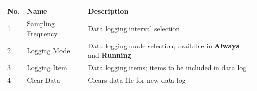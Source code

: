 \begin{longtable}[]{@{}lll@{}}
\toprule
\begin{minipage}[b]{0.04\columnwidth}\raggedright
No.\strut
\end{minipage} & \begin{minipage}[b]{0.23\columnwidth}\raggedright
Name\strut
\end{minipage} & \begin{minipage}[b]{0.65\columnwidth}\raggedright
Description\strut
\end{minipage}\tabularnewline
\midrule
\endhead
\begin{minipage}[t]{0.04\columnwidth}\raggedright
1\strut
\end{minipage} & \begin{minipage}[t]{0.23\columnwidth}\raggedright
Sampling Frequency\strut
\end{minipage} & \begin{minipage}[t]{0.65\columnwidth}\raggedright
Data logging interval selection\strut
\end{minipage}\tabularnewline
\begin{minipage}[t]{0.04\columnwidth}\raggedright
2\strut
\end{minipage} & \begin{minipage}[t]{0.23\columnwidth}\raggedright
Logging Mode\strut
\end{minipage} & \begin{minipage}[t]{0.65\columnwidth}\raggedright
Data logging mode selection; available in \textbf{Always} and
\textbf{Running}\strut
\end{minipage}\tabularnewline
\begin{minipage}[t]{0.04\columnwidth}\raggedright
3\strut
\end{minipage} & \begin{minipage}[t]{0.23\columnwidth}\raggedright
Logging Item\strut
\end{minipage} & \begin{minipage}[t]{0.65\columnwidth}\raggedright
Data logging items; items to be included in data log\strut
\end{minipage}\tabularnewline
\begin{minipage}[t]{0.04\columnwidth}\raggedright
4\strut
\end{minipage} & \begin{minipage}[t]{0.23\columnwidth}\raggedright
Clear Data\strut
\end{minipage} & \begin{minipage}[t]{0.65\columnwidth}\raggedright
Clears data file for new data log\strut
\end{minipage}\tabularnewline
\bottomrule
\end{longtable}

